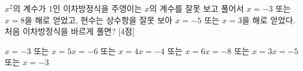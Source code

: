 $x^2$의 계수가 $1$인 이차방정식을 주영이는 $x$의 계수를 잘못 보고 풀어서 $x=-3$ 또는 $x=8$을 해로 얻었고, 현수는 상수항을 잘못 보아 $x=-5$ 또는 $x=3$을 해로 얻었다. 처음 이차방정식을 바르게 풀면? \mbox{[4점]}
\begin{choicesii}{$x=-3$ 또는 $x=5$}{$x=-6$ 또는 $x=4$}{$x=-4$ 또는 $x=6$}{$x=-8$ 또는 $x=3$}{$x=-5$ 또는 $x=-3$}\end{choicesii}
